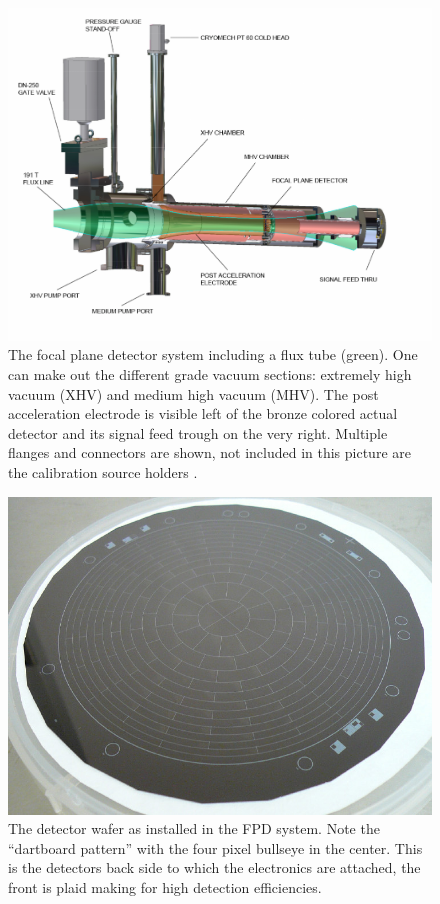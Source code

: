       
      \begin{figure}
      \centering
	\includegraphics[width = 0.8 \textwidth]{graphics/katrinExperiment/detectorHousing.pdf}
	\caption[Focal plane detector system]{The focal plane detector system including a flux tube (green). One can make out the different grade vacuum sections: extremely high vacuum (XHV) and medium high vacuum (MHV). The post acceleration electrode is visible left of the bronze colored actual detector and its signal feed trough on the very right. Multiple flanges and connectors are shown, not included in this picture are the calibration source holders \cite{FPD}.}
	\label{fig:katrinExperiment:detectorHousing}
      \end{figure}
      
      \begin{figure}
      \centering
      	\includegraphics[width = 0.7 \textwidth]{graphics/katrinExperiment/detectorWafer.jpg}
	  \caption[Detector wafer]{The detector wafer as installed in the FPD system. Note the ``dartboard pattern'' with the four pixel bullseye in the center. This is the detectors back side to which the electronics are attached, the front is plaid making for high detection efficiencies.}
	  \label{fig:katrinExperiment:detectorWafer}
      \end{figure}
      
